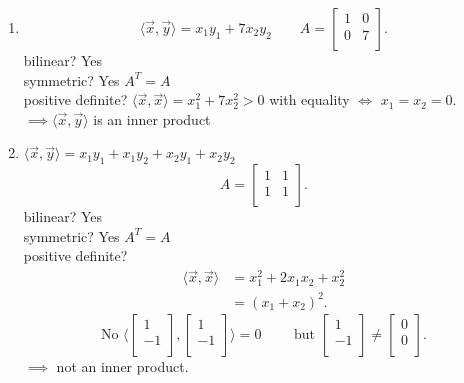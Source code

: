 \documentclass{report}
\begin{document}
\begin{enumerate} [label=(\alph*)]
\[     .\] 
    \item 
     \[
     \langle \vec{ x} ,\vec{ y}   \rangle = x_1 y_1 + 7 x_2 y_2 \qquad  A = \begin{bmatrix}
     1 & 0\\
     0 & 7\\
     \end{bmatrix}
     .\] 
     bilinear? Yes\\
     symmetric? Yes $ A^{T}=A$ \\
     positive definite? $ \langle \vec{ x} ,\vec{ x}   \rangle = x_1^2 + 7 x_2 ^2 > 0$ with equality  $ \iff$ $ x_1 = x_2 =0$.\\
     $ \implies \langle \vec{ x} ,\vec{ y}   \rangle $ is an inner product 
    \item $ \langle \vec{ x} , \vec{ y}   \rangle = x_1 y_1 + x_1 y_2 + x_2 y_1 + x_2 y_2$
     \[
     A = \begin{bmatrix}
     1 & 1\\
     1 & 1\\
     \end{bmatrix}
     .\] 
     bilinear? Yes\\
     symmetric? Yes $ A^{T}=A$ \\
     positive definite?\\
     \begin{align*}
      \langle \vec{ x} ,\vec{ x}   \rangle &= x_1^2 + 2 x_1 x_2 + x_2 ^2 \\
      &= \left( x_1 + x_2 \right) ^2 
     .\end{align*}
     \[
     \text{No } \langle \begin{bmatrix}
     1\\
     -1\\
     \end{bmatrix}  , \begin{bmatrix}
     1\\
     -1\\
     \end{bmatrix}\rangle =0 \qquad  \text{ but } \begin{bmatrix}
     1\\
     -1\\
     \end{bmatrix}
     \neq \begin{bmatrix}
     0\\
     0\\
     \end{bmatrix}
        
     .\]
     $ \implies$ not an inner product.\\
    \end{enumerate}
\end{document}
